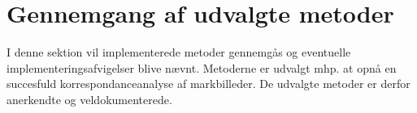 \chapter{Gennemgang af udvalgte metoder}\label{sec:detmet}
I denne sektion vil implementerede metoder gennemgås og eventuelle implementeringsafvigelser blive nævnt. Metoderne er udvalgt mhp. at opnå en succesfuld korrespondanceanalyse af markbilleder. De udvalgte metoder er derfor anerkendte og veldokumenterede.





